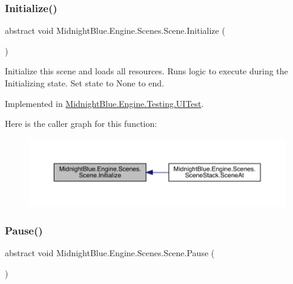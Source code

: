 \subsubsection{\texorpdfstring{Initialize()}{Initialize()}}
{\footnotesize\ttfamily abstract void Midnight\+Blue.\+Engine.\+Scenes.\+Scene.\+Initialize (\begin{DoxyParamCaption}{ }\end{DoxyParamCaption})\hspace{0.3cm}{\ttfamily [pure virtual]}}



Initialize this scene and loads all resources. Runs logic to execute during the Initializing state. Set state to None to end. 



Implemented in \hyperlink{class_midnight_blue_1_1_engine_1_1_testing_1_1_u_i_test_ad2b7f129febf8658c10c7881af15c847}{Midnight\+Blue.\+Engine.\+Testing.\+U\+I\+Test}.

Here is the caller graph for this function\+:
\nopagebreak
\begin{figure}[H]
\begin{center}
\leavevmode
\includegraphics[width=350pt]{class_midnight_blue_1_1_engine_1_1_scenes_1_1_scene_aa919101862c14384b955d91a4d3362ab_icgraph}
\end{center}
\end{figure}
\hypertarget{class_midnight_blue_1_1_engine_1_1_scenes_1_1_scene_aeb3c4d9bea0177d21fbffcdabab660de}{}\label{class_midnight_blue_1_1_engine_1_1_scenes_1_1_scene_aeb3c4d9bea0177d21fbffcdabab660de} 
\subsubsection{\texorpdfstring{Pause()}{Pause()}}
{\footnotesize\ttfamily abstract void Midnight\+Blue.\+Engine.\+Scenes.\+Scene.\+Pause (\begin{DoxyParamCaption}{ }\end{DoxyParamCaption})\hspace{0.3cm}{\ttfamily [pure virtual]}}



